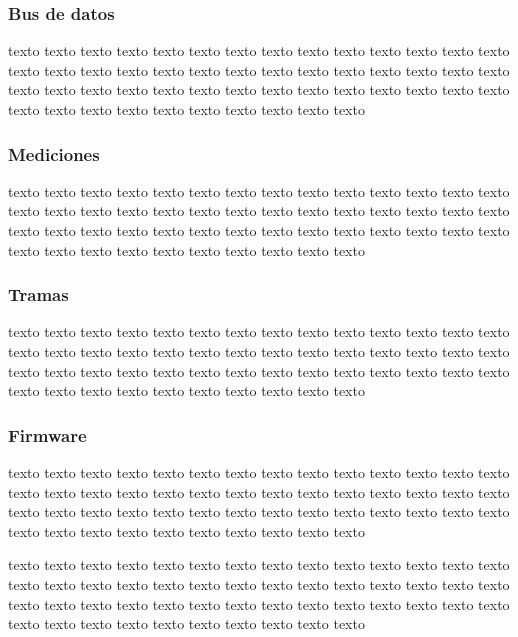 \documentclass[
11pt, %
]{charter}
\begin{document}
\subsubsection{Bus de datos}

texto texto texto texto texto texto texto texto texto texto texto texto texto texto texto texto texto texto texto texto texto texto texto texto texto texto texto texto texto texto texto texto texto texto texto texto texto texto texto texto texto texto texto texto texto texto texto texto texto texto texto texto 


\subsubsection{Mediciones}

texto texto texto texto texto texto texto texto texto texto texto texto texto texto texto texto texto texto texto texto texto texto texto texto texto texto texto texto texto texto texto texto texto texto texto texto texto texto texto texto texto texto texto texto texto texto texto texto texto texto texto texto 


\subsubsection{Tramas}

texto texto texto texto texto texto texto texto texto texto texto texto texto texto texto texto texto texto texto texto texto texto texto texto texto texto texto texto texto texto texto texto texto texto texto texto texto texto texto texto texto texto texto texto texto texto texto texto texto texto texto texto 


\subsubsection{Firmware}

texto texto texto texto texto texto texto texto texto texto texto texto texto texto texto texto texto texto texto texto texto texto texto texto texto texto texto texto texto texto texto texto texto texto texto texto texto texto texto texto texto texto texto texto texto texto texto texto texto texto texto texto 



texto texto texto texto texto texto texto texto texto texto texto texto texto texto texto texto texto texto texto texto texto texto texto texto texto texto texto texto texto texto texto texto texto texto texto texto texto texto texto texto texto texto texto texto texto texto texto texto texto texto texto texto 
\end{document}
